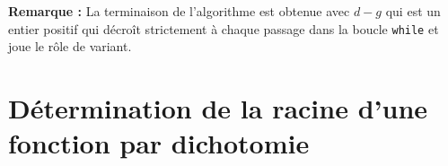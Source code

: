 \textbf{Remarque :} La terminaison de l'algorithme est obtenue avec $d-g$ qui est un entier positif qui décro\^{i}t strictement à chaque passage dans la boucle \texttt{while} et joue le rôle de variant.


\section{Détermination de la racine d'une fonction par dichotomie}

